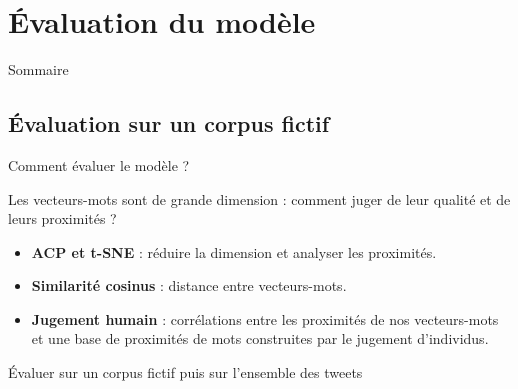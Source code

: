\documentclass[10pt,xcolor=table,color={dvipsnames,usenames},ignorenonframetext,usepdftitle=false,french]{beamer}
\begin{document}
\hypertarget{uxe9valuation-du-moduxe8le}{%
\section{Évaluation du modèle}\label{uxe9valuation-du-moduxe8le}}

\begin{frame}{Sommaire}
\protect\hypertarget{sommaire-1}{}


\end{frame}

\hypertarget{uxe9valuation-sur-un-corpus-fictif}{%
\subsection{Évaluation sur un corpus
fictif}\label{uxe9valuation-sur-un-corpus-fictif}}

\begin{frame}{Comment évaluer le modèle ?}
\protect\hypertarget{comment-uxe9valuer-le-moduxe8le}{}

Les vecteurs-mots sont de grande dimension : comment juger de leur
qualité et de leurs proximités ?

\begin{itemize}
\item
  \textbf{ACP et t-SNE} : réduire la dimension et analyser les
  proximités.
\item
  \textbf{Similarité cosinus} : distance entre vecteurs-mots.
\item
  \textbf{Jugement humain} : corrélations entre les proximités de nos
  vecteurs-mots et une base de proximités de mots construites par le
  jugement d'individus.
\end{itemize}

\bigskip

\faArrowCircleRight{} Évaluer sur un corpus fictif puis sur l'ensemble
des tweets

\end{frame}
\end{document}
